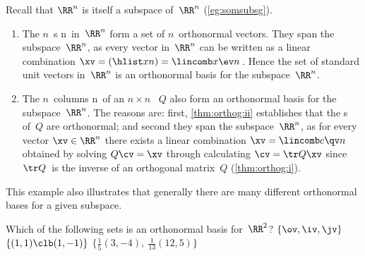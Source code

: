 \begin{example} 
Recall that \(\RR^n\) is itself a subspace of~\(\RR^n\) (\cref{eg:somsubsg}).
\begin{enumerate}
\item The \(n\)~s \hlist\ev n\ in~\(\RR^n\) form a set of \(n\)~orthonormal vectors.
They span the subspace~\(\RR^n\), as every vector in~\(\RR^n\) can be written as a linear combination \(\xv=(\hlist xn)=\lincomb x\ev n\)\,.
Hence the set of standard unit vectors in~\(\RR^n\) is an orthonormal basis for the subspace~\(\RR^n\).

\item The \(n\)~columns \hlist\qv n\ of an \(n\times n\) ~\(Q\) also form an orthonormal basis for the subspace~\(\RR^n\).
The reasons are: first, \cref{thm:orthog:ii} establishes that the s of~\(Q\) are orthonormal; and second they span the subspace~\(\RR^n\), as for every vector \(\xv\in\RR^n\) there exists a linear combination \(\xv=\lincomb c\qv n\) obtained by solving \(Q\cv=\xv\) through calculating \(\cv=\tr Q\xv\) since \(\tr Q\)~is the inverse of an orthogonal matrix~\(Q\) (\cref{thm:orthog:i}).
\end{enumerate}
This example also illustrates that generally there are many different orthonormal bases for a given subspace.
\end{example}



\begin{activity}
Which of the following sets is an orthonormal basis for~\(\RR^2\)?
{\(\{\ov,\iv,\jv\}\)}
{\(\{(1,1)\clb (1,-1)\}\)}
{\(\{\frac15(3,-4),\ \frac1{13}(12,5)\}\)}
\end{activity}



